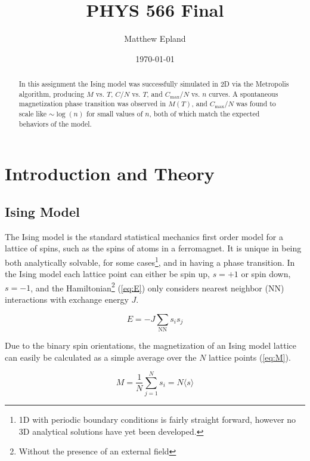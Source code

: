 \documentclass[notitlepage,aps,prd,nofootinbib]{revtex4-1}
\begin{document}
\title{PHYS 566 Final}
\author{Matthew Epland}

\date{\today}

\begin{abstract}
In this assignment the Ising model was successfully simulated in 2D via the Metropolis algorithm, producing $M$ vs. $T$, $C/N$ vs. $T$, and $C_{\mathrm{max}}/N$ vs. $n$ curves. A spontaneous magnetization phase transition was observed in $M\left(T\right)$, and $C_{\mathrm{max}}/N$ was found to scale like $\sim \log(n)$ for small values of $n$, both of which match the expected behaviors of the model.
\end{abstract}\maketitle

\section{Introduction and Theory}
\label{sec:theory}
\subsection{Ising Model}
\label{subsec:ising}
The Ising model is the standard statistical mechanics first order model for a lattice of spins, such as the spins of atoms in a ferromagnet. It is unique in being both analytically solvable, for some cases\footnote{1D with periodic boundary conditions is fairly straight forward, however no 3D analytical solutions have yet been developed.}, and in having a phase transition. In the Ising model each lattice point can either be spin up, $s=+1$ or spin down, $s=-1$, and the Hamiltonian\footnote{Without the presence of an external field} (\ref{eq:E}) only considers nearest neighbor (NN) interactions with exchange energy $J$.

\begin{equation}
\label{eq:E}
E = -J \sum_{\mathrm{NN}} s_{i} s_{j}
\end{equation}

Due to the binary spin orientations, the magnetization of an Ising model lattice can easily be calculated as a simple average over the $N$ lattice points (\ref{eq:M}).

\begin{equation}
\label{eq:M}
M = \frac{1}{N} \sum_{j=1}^{N} s_{i} = N \langle s \rangle
\end{equation}
\end{document}
